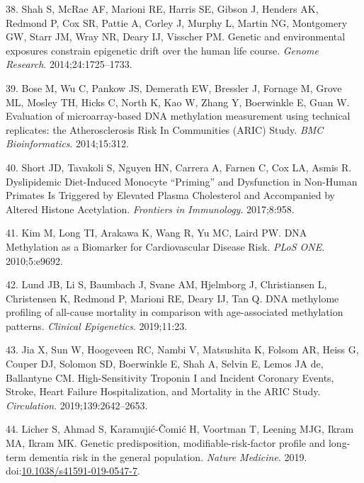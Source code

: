 \documentclass[]{article}
\begin{document}
\leavevmode\hypertarget{ref-Shah2014}{}%
38. Shah S, McRae AF, Marioni RE, Harris SE, Gibson J, Henders AK,
Redmond P, Cox SR, Pattie A, Corley J, Murphy L, Martin NG, Montgomery
GW, Starr JM, Wray NR, Deary IJ, Visscher PM. Genetic and environmental
exposures constrain epigenetic drift over the human life course.
\emph{Genome Research}. 2014;24:1725--1733.

\leavevmode\hypertarget{ref-Bose2014}{}%
39. Bose M, Wu C, Pankow JS, Demerath EW, Bressler J, Fornage M, Grove
ML, Mosley TH, Hicks C, North K, Kao W, Zhang Y, Boerwinkle E, Guan W.
Evaluation of microarray-based DNA methylation measurement using
technical replicates: the Atherosclerosis Risk In Communities (ARIC)
Study. \emph{BMC Bioinformatics}. 2014;15:312.

\leavevmode\hypertarget{ref-Short2017}{}%
40. Short JD, Tavakoli S, Nguyen HN, Carrera A, Farnen C, Cox LA, Asmis
R. Dyslipidemic Diet-Induced Monocyte ``Priming'' and Dysfunction in
Non-Human Primates Is Triggered by Elevated Plasma Cholesterol and
Accompanied by Altered Histone Acetylation. \emph{Frontiers in
Immunology}. 2017;8:958.

\leavevmode\hypertarget{ref-Kim2010}{}%
41. Kim M, Long TI, Arakawa K, Wang R, Yu MC, Laird PW. DNA Methylation
as a Biomarker for Cardiovascular Disease Risk. \emph{PLoS ONE}.
2010;5:e9692.

\leavevmode\hypertarget{ref-Lund2019}{}%
42. Lund JB, Li S, Baumbach J, Svane AM, Hjelmborg J, Christiansen L,
Christensen K, Redmond P, Marioni RE, Deary IJ, Tan Q. DNA methylome
profiling of all-cause mortality in comparison with age-associated
methylation patterns. \emph{Clinical Epigenetics}. 2019;11:23.

\leavevmode\hypertarget{ref-Jia2019}{}%
43. Jia X, Sun W, Hoogeveen RC, Nambi V, Matsushita K, Folsom AR, Heiss
G, Couper DJ, Solomon SD, Boerwinkle E, Shah A, Selvin E, Lemos JA de,
Ballantyne CM. High-Sensitivity Troponin I and Incident Coronary Events,
Stroke, Heart Failure Hospitalization, and Mortality in the ARIC Study.
\emph{Circulation}. 2019;139:2642--2653.

\leavevmode\hypertarget{ref-Licher2019}{}%
44. Licher S, Ahmad S, Karamujić-Čomić H, Voortman T, Leening MJG, Ikram
MA, Ikram MK. Genetic predisposition, modifiable-risk-factor profile and
long-term dementia risk in the general population. \emph{Nature
Medicine}. 2019.
doi:\href{https://doi.org/10.1038/s41591-019-0547-7}{10.1038/s41591-019-0547-7}.
\end{document}
